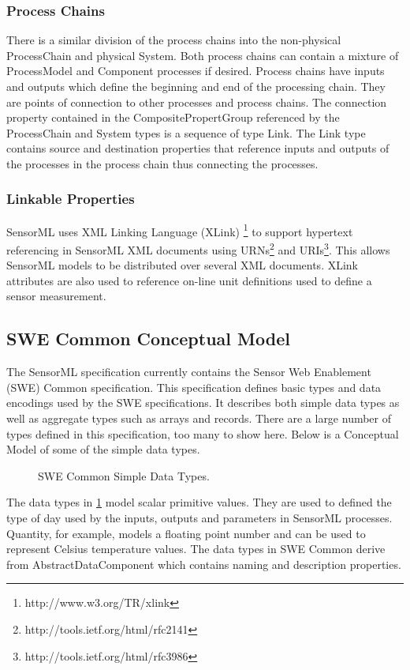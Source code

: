 \documentclass[]{final_report}
\begin{document}
\subsubsection{Process Chains}
There is a similar division of the process chains into the non-physical ProcessChain and physical System. Both process chains can contain a mixture of ProcessModel and Component processes if desired. Process chains have inputs and outputs which define the beginning and end of the processing chain. They are points of connection to other processes and process chains. The connection property contained in the CompositePropertGroup referenced by the  ProcessChain and System types is a sequence of type Link. The Link type contains source and destination properties that reference inputs and outputs of the processes in the process chain thus connecting the processes.

\subsubsection{Linkable Properties}
SensorML uses XML Linking Language (XLink) \footnote{http://www.w3.org/TR/xlink} to support hypertext referencing in SensorML XML documents using URNs\footnote{http://tools.ietf.org/html/rfc2141} and URIs\footnote{http://tools.ietf.org/html/rfc3986}. This allows SensorML models to be distributed over several XML documents. XLink attributes are also used to reference on-line unit definitions used to define a sensor measurement.

\subsection{SWE Common Conceptual Model}\label{SMLsectionSWE}
The SensorML specification currently contains the Sensor Web Enablement (SWE) Common specification. This specification defines basic types and data encodings used by the SWE specifications. It describes both simple data types as well as aggregate types such as arrays and records. There are a large number of types defined in this specification, too many to show here. Below is a Conceptual Model of some of the simple data types.

\begin{figure}[h]
\centering
{}
\caption{SWE Common Simple Data Types.}\label{fig:SWESimpleConceptualModel}
\end{figure}

The data types in \ref{fig:SWESimpleConceptualModel} model scalar primitive values. They are used to defined the type of day used by the inputs, outputs and parameters in SensorML processes. Quantity, for example, models a floating point number and can be used to represent Celsius temperature values. The data types in SWE Common derive from AbstractDataComponent which contains naming and description properties.
\end{document}

